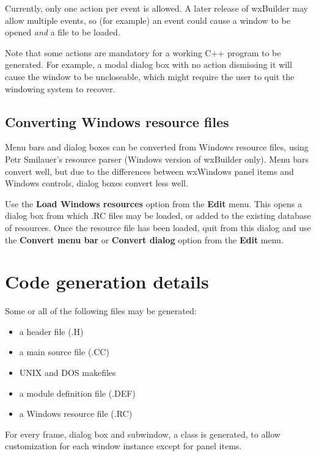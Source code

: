 Currently, only one action per event is allowed. A later release of
wxBuilder may allow multiple events, so (for example) an event could
cause a window to be opened {\it and} a file to be loaded.

Note that some actions are mandatory for a working C++ program to be
generated. For example, a modal dialog box with no action dismissing it
will cause the window to be uncloseable, which might require the user to
quit the windowing system to recover.

\section{Converting Windows resource files}

Menu bars and dialog boxes can be converted from Windows resource files,
using Petr Smilauer's resource parser (Windows version of wxBuilder
only). Menu bars convert well, but due to the differences between
wxWindows panel items and Windows controls, dialog boxes convert less
well.

Use the {\bf Load Windows resources} option from the {\bf Edit}\rtfsp
menu. This opens a dialog box from which .RC files may be loaded,
or added to the existing database of resources. Once the resource
file has been loaded, quit from this dialog and use the\rtfsp
{\bf Convert menu bar} or {\bf Convert dialog} option from
the {\bf Edit} menu.

\chapter{Code generation details}%
%
\setfooter{\thepage}{}{}{}{}{\thepage}%

Some or all of the following files may be generated:

\begin{itemize}
\item a header file (.H)
\item a main source file (.CC)
\item UNIX and DOS makefiles
\item a module definition file (.DEF)
\item a Windows resource file (.RC)
\end{itemize}

For every frame, dialog box and subwindow, a class is generated, to
allow customization for each window instance except for panel items.

